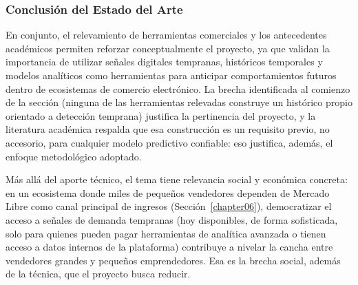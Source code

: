 \subsubsection*{Conclusión del Estado del Arte}

En conjunto, el relevamiento de herramientas comerciales y los antecedentes académicos permiten reforzar conceptualmente el proyecto, ya que validan la importancia de utilizar señales digitales tempranas, históricos temporales y modelos analíticos como herramientas para anticipar comportamientos futuros dentro de ecosistemas de comercio electrónico. La brecha identificada al comienzo de la sección (ninguna de las herramientas relevadas construye un histórico propio orientado a detección temprana) justifica la pertinencia del proyecto, y la literatura académica respalda que esa construcción es un requisito previo, no accesorio, para cualquier modelo predictivo confiable: eso justifica, además, el enfoque metodológico adoptado.

Más allá del aporte técnico, el tema tiene relevancia social y económica concreta: en un ecosistema donde miles de pequeños vendedores dependen de Mercado Libre como canal principal de ingresos (Sección~\ref{chapter06}), democratizar el acceso a señales de demanda tempranas (hoy disponibles, de forma sofisticada, solo para quienes pueden pagar herramientas de analítica avanzada o tienen acceso a datos internos de la plataforma) contribuye a nivelar la cancha entre vendedores grandes y pequeños emprendedores. Esa es la brecha social, además de la técnica, que el proyecto busca reducir.
